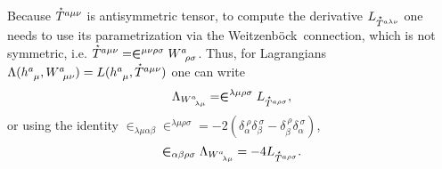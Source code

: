 \documentclass[
10pt, %
a4paper, %
oneside, %
headinclude,footinclude, %
BCOR5mm, %
]{scrartcl}
\newcommand{\tetrsymbol}{h}
\newcommand{\tetr}[2]{\tetrsymbol^{#1}_{\phantom{#1}#2}}
\newcommand{\w}[2]{W^{#1}_{\phantom{#1}#2}}
\newcommand{\We}{Weitzenb\"ock}
\newcommand{\Lag}{\Lambda}	%
\newcommand{\Laghodge}{L}%
\newcommand{\LCsymb}{\bm{\in}}    %
\newcommand{\HDT}[1]{\accentset{\star}{T}^{#1}}
\newcommand{\KD}[2]{\delta^{\ #1}_{#2}}
\begin{document}
Because $ \HDT{a\mu\nu} $ is 
antisymmetric tensor, to compute the derivative $ \Laghodge_{\HDT{a\lambda\nu}} $ one needs to use 
its parametrization via the \We\ connection, which is not symmetric, i.e. $ \HDT{a\mu\nu} = 
\LCsymb^{\mu\nu\rho\sigma} \w{a}{\rho\sigma}$. Thus, for Lagrangians $ 
\Lag(\tetr{a}{\mu},\w{a}{\mu\nu}) = 
\Laghodge(\tetr{a}{\mu},\HDT{a\mu\nu})$ one can write 
\begin{equation}
	\Lag_{\w{a}{\lambda\mu}} = \LCsymb^{\lambda\mu\rho\sigma} \Laghodge_{\HDT{a\rho\sigma}},
\end{equation}
or using the identity $ \LCsymb_{\lambda\mu\alpha\beta}\LCsymb^{\lambda\mu\rho\sigma} = 
-2(\KD{\rho}{\alpha}\KD{\sigma}{\beta} - \KD{\rho}{\beta}\KD{\sigma}{\alpha}) $, 
\begin{equation}\label{eqn.L.T}
	\LCsymb_{\alpha\beta\rho\sigma}\Lag_{\w{a}{\lambda\mu}} = -4 \Laghodge_{\HDT{a\rho\sigma}}.
\end{equation}
\end{document}
